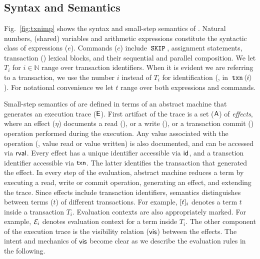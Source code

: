 \section{\txnimp}
\label{sec:opsem}



\subsection{Syntax and Semantics}
\label{sec:syntax}

Fig.~\ref{fig:txnimp} shows the syntax and small-step semantics of
\txnimp. Natural numbers, (shared) variables and arithmetic
expressions constitute the syntactic class of expressions ($e$).
Commands ($c$) include $\,{\tt SKIP}\,$, assignment statements, transaction
() lexical blocks, and their sequential and parallel
composition. We let $T_i$ for $i \in \mathbb{N}$ range over
transaction identifiers. When it is evident we are referring to a
transaction, we use the number $i$ instead of $T_i$ for identification
(\eg, in $\,{\tt txn}\,\langle i \rangle$). For notational convenience we let
$t$ range over both expressions and commands.

Small-step semantics of \txnimp are defined in terms of an abstract
machine that generates an execution trace ($\textsf{E}$). First artifact of
the trace is a set ($\textsf{A}$) of \emph{effects}, where an effect ($\eta$)
documents a read (), or a write (), or a transaction
commit () operation performed during the execution. Any
value associated with the operation (\eg, value read or value written)
is also documented, and can be accessed via $\textsf{rval}$. Every effect has
a unique identifier accessible via $\textsf{id}$, and a transction identifier
accessible via $\textsf{txn}$.  The latter identifies the transaction that
generated the effect. In every step of the evaluation, abstract
machine reduces a \txnimp term by executing a read, write or commit
operation, generating an effect, and extending the trace. Since
effects include transaction identifiers, semantics distinguishes
between terms ($t$) of different transactions. For example,
$\lbrack t \rbrack_i$ denotes a term $t$ inside a transaction $T_i$.
Evaluation contexts are also appropriately marked. For example,
$\mathcal{E}_i$ denotes evaluation context for a term inside $T_i$. The
other component of the execution trace is the visibility relation
($\textsf{vis}$) between the effects. The intent and mechanics of $\textsf{vis}$
become clear as we describe the evaluation rules in the following.

